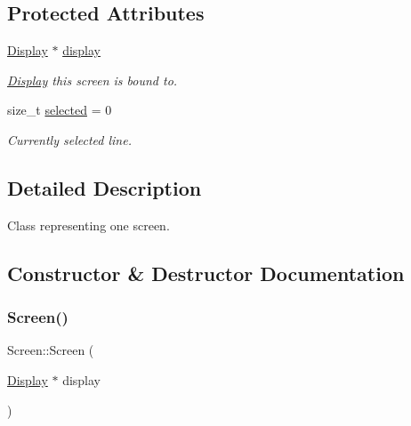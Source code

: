 \subsection*{Protected Attributes}
\begin{DoxyCompactItemize}
\item 
\mbox{\label{classScreen_aad713267725e8aa8a8def951a07de641}} 
\mbox{\hyperlink{classDisplay}{Display}} $\ast$ \mbox{\hyperlink{classScreen_aad713267725e8aa8a8def951a07de641}{display}}
\begin{DoxyCompactList}\small\item\em \mbox{\hyperlink{classDisplay}{Display}} this screen is bound to. \end{DoxyCompactList}\item 
\mbox{\label{classScreen_ae66538a4cf9fd681495f28acb12be732}} 
size\+\_\+t \mbox{\hyperlink{classScreen_ae66538a4cf9fd681495f28acb12be732}{selected}} = 0
\begin{DoxyCompactList}\small\item\em Currently selected line. \end{DoxyCompactList}\end{DoxyCompactItemize}


\subsection{Detailed Description}
Class representing one screen. 

\subsection{Constructor \& Destructor Documentation}
\mbox{\label{classScreen_a596e7fffdfafd57fb5385c299863f31d}} 
\subsubsection{\texorpdfstring{Screen()}{Screen()}}
{\footnotesize\ttfamily Screen\+::\+Screen (\begin{DoxyParamCaption}\item[{\mbox{\hyperlink{classDisplay}{Display}} $\ast$}]{display }\end{DoxyParamCaption})\hspace{0.3cm}{\ttfamily [protected]}}



